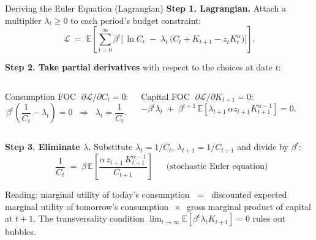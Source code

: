 \documentclass[aspectratio=169,11pt]{beamer}
\newcommand{\emphc}[1]{\textcolor{harvardcrimson}{#1}}
\newcommand{\E}[1]{\mathbb{E}\!\left[#1\right]}
\begin{document}
\begin{frame}{Deriving the Euler Equation (Lagrangian)}
\footnotesize
\textbf{Step 1. Lagrangian.} Attach a multiplier $\lambda_t \ge 0$ to each period's budget constraint:
\[
\mathcal{L} \;=\; \E{\sum_{t=0}^{\infty} \beta^t \Big[\, \ln C_t \;-\; \lambda_t\,\big( C_t + K_{t+1} - z_t K_t^{\alpha} \big) \Big]}.
\]

\vspace{0.2em}
\textbf{Step 2. Take partial derivatives} with respect to the choices at date $t$:
\begin{columns}[T]
\emphc{Consumption FOC} $\;\partial\mathcal{L}/\partial C_t = 0$:
\[
\beta^t\!\left( \frac{1}{C_t} - \lambda_t \right) = 0
\;\;\Longrightarrow\;\; \lambda_t = \frac{1}{C_t}.
\]

\emphc{Capital FOC} $\;\partial\mathcal{L}/\partial K_{t+1} = 0$:
\[
-\beta^t \lambda_t \;+\; \beta^{t+1}\,\E{\lambda_{t+1}\,\alpha z_{t+1} K_{t+1}^{\alpha-1}} = 0.
\]
\end{columns}

\vspace{0.3em}
\textbf{Step 3. Eliminate $\lambda$.} Substitute $\lambda_t = 1/C_t$, $\lambda_{t+1} = 1/C_{t+1}$ and divide by $\beta^t$:
\[
\boxed{\;\; \frac{1}{C_t} \;=\; \beta\, \E{\frac{\alpha\, z_{t+1}\, K_{t+1}^{\alpha-1}}{C_{t+1}}} \;\;} \quad \text{(stochastic Euler equation)}
\]

\vspace{0.2em}
{\scriptsize\emphc{Reading:} marginal utility of today's consumption $\; = \;$ discounted expected marginal utility of tomorrow's consumption $\,\times\,$ gross marginal product of capital at $t{+}1$. The transversality condition $\lim_{t\to\infty}\E{\beta^t \lambda_t K_{t+1}} = 0$ rules out bubbles.}
\end{frame}
\end{document}
